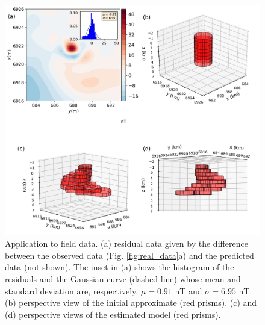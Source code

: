\begin{figure}
    \centering
    \includegraphics[scale=.5]{figures/real_results.png}
    \caption{Application to field data. (a) residual data given by the difference between the observed data (Fig. \ref{fig:real_data}a) and the predicted data (not shown). The inset in (a) shows the histogram of the residuals and the Gaussian curve (dashed line) whose mean and standard deviation are, respectively, $\mu = 0.91$ nT and $\sigma=6.95$ nT. (b) perspective view of the initial approximate (red prisms). (c) and (d) perspective views of the estimated model (red prisms). 
}
    \label{fig:real_result}
\end{figure}